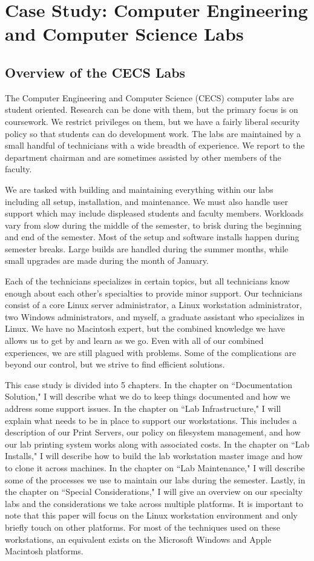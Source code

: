 \chapter{Case Study:  Computer Engineering and Computer Science Labs} \label{ch:introduction_case_study}
\section{Overview of the CECS Labs}

The Computer Engineering and Computer Science (CECS) computer labs are student oriented.  Research can be done with them, but the primary focus is on coursework.  We restrict privileges on them, but we have a fairly liberal security policy so that students can do development work.  The labs are maintained by a small handful of technicians with a wide breadth of experience.  We report to the department chairman and are sometimes assisted by other members of the faculty. 

We are tasked with building and maintaining everything within our labs including all setup, installation, and maintenance.  We must also handle user support which may include displeased students and faculty members.  Workloads vary from slow during the middle of the semester, to brisk during the beginning and end of the semester.  Most of the setup and software installs happen during semester breaks.  Large builds are handled during the summer months, while small upgrades are made during the month of January. 

Each of the technicians specializes in certain topics, but all technicians know enough about each other’s specialties to provide minor support.  Our technicians consist of a core Linux server administrator, a Linux workstation administrator, two Windows administrators, and myself, a graduate assistant who specializes in Linux.  We have no Macintosh expert, but the combined knowledge we have allows us to get by and learn as we go.  Even with all of our combined experiences, we are still plagued with problems.  Some of the complications are beyond our control, but we strive to find efficient solutions. 

This case study is divided into 5 chapters.  In the chapter on ``Documentation Solution," I will describe what we do to keep things documented and how we address some support issues.  In the chapter on ``Lab Infrastructure," I will explain what needs to be in place to support our workstations.  This includes a description of our Print Servers, our policy on filesystem management, and how our lab printing system works along with associated costs.  In the chapter on ``Lab Installs," I will describe how to build the lab workstation master image and how to clone it across machines.  In the chapter on ``Lab Maintenance," I will describe some of the processes we use to maintain our labs during the semester.  Lastly, in the chapter on ``Special Considerations," I will give an overview on our specialty labs and the considerations we take across multiple platforms.  It is important to note that this paper will focus on the Linux workstation environment and only briefly touch on other platforms.  For most of the techniques used on these workstations, an equivalent exists on the Microsoft Windows and Apple Macintosh platforms.

